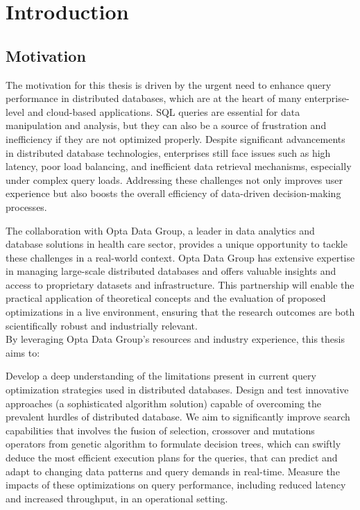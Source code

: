 \section{Introduction}

\subsection{Motivation}
The motivation for this thesis is driven by the urgent need to enhance query performance in distributed databases, which are at the heart of many enterprise-level and cloud-based applications. SQL queries are essential for data manipulation and analysis, but they can also be a source of frustration and inefficiency if they are not optimized properly. Despite significant advancements in distributed database technologies, enterprises still face issues such as high latency, poor load balancing, and inefficient data retrieval mechanisms, especially under complex query loads. Addressing these challenges not only improves user experience but also boosts the overall efficiency of data-driven decision-making processes.

The collaboration with Opta Data Group, a leader in data analytics and database solutions in health care sector, provides a unique opportunity to tackle these challenges in a real-world context. Opta Data Group has extensive expertise in managing large-scale distributed databases and offers valuable insights and access to proprietary datasets and infrastructure. This partnership will enable the practical application of theoretical concepts and the evaluation of proposed optimizations in a live environment, ensuring that the research outcomes are both scientifically robust and industrially relevant.\\

By leveraging Opta Data Group's resources and industry experience, this thesis aims to:

Develop a deep understanding of the limitations present in current query optimization strategies used in distributed databases. Design and test innovative approaches (a sophisticated algorithm solution) capable of overcoming the prevalent hurdles of distributed database. We aim to significantly improve search capabilities that involves the fusion of selection, crossover and mutations operators from genetic algorithm to formulate decision trees, which can swiftly deduce the most efficient execution plans for the queries, that can predict and adapt to changing data patterns and query demands in real-time. Measure the impacts of these optimizations on query performance, including reduced latency and increased throughput, in an operational setting.\\

